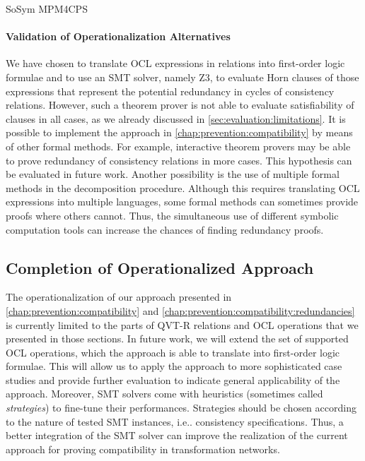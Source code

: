 \begin{copiedFrom}{SoSym MPM4CPS}
\paragraph{Validation of Operationalization Alternatives}
We have chosen to translate OCL expressions in \qvtr relations into first-order logic formulae and to use an SMT solver, namely Z3, to evaluate Horn clauses of those expressions that represent the potential redundancy in cycles of consistency relations. However, such a theorem prover is not able to evaluate satisfiability of clauses in all cases, as we already discussed in \autoref{sec:evaluation:limitations}. It is possible to implement the approach in \autoref{chap:prevention:compatibility} by means of other formal methods. For example, interactive theorem provers may be able to prove redundancy of consistency relations in more cases. This hypothesis can be evaluated in future work. Another possibility is the use of multiple formal methods in the decomposition procedure. Although this requires translating OCL expressions into multiple languages, some formal methods can sometimes provide proofs where others cannot. Thus, the simultaneous use of different symbolic computation tools can increase the chances of finding redundancy proofs.



\subsection{Completion of Operationalized Approach}
The operationalization of our approach presented in \autoref{chap:prevention:compatibility} and \autoref{chap:prevention:compatibility:redundancies} is currently limited to the parts of QVT-R relations and OCL operations that we presented in those sections. In future work, we will extend the set of supported OCL operations, which the approach is able to translate into first-order logic formulae.
This will allow us to apply the approach to more sophisticated case studies and provide further evaluation to indicate general applicability of the approach.
Moreover, SMT solvers come with heuristics (sometimes called \textit{strategies}) to fine-tune their performances. Strategies should be chosen according to the nature of tested SMT instances, i.e.. consistency specifications. Thus, a better integration of the SMT solver can improve the realization of the current approach for proving compatibility in transformation networks.


\end{copiedFrom}
